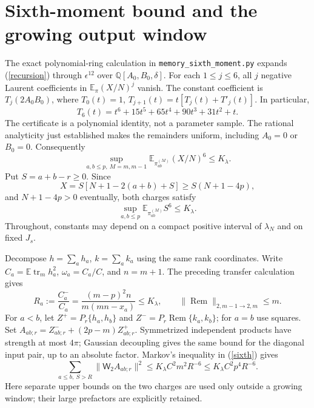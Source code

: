 \documentclass[11pt,a4paper]{article}
\newcommand{\EE}{\mathbb E}
\newcommand{\tr}{\operatorname{tr}}
\newcommand{\Rem}{\operatorname{Rem}}
\newcommand{\W}{\mathsf W_2}
\begin{document}
\newpage
\section{Sixth-moment bound and the growing output window}
The exact polynomial-ring calculation in
\texttt{memory\_sixth\_moment.py} expands (\ref{recursion}) through
$\epsilon^{12}$ over $\mathbb Q[A_0,B_0,\delta]$. For each $1\leq j\leq6$,
all $j$ negative Laurent coefficients in $\EE_\pi(X/N)^j$ vanish.
The constant coefficient is $T_j(2A_0B_0)$, where
$T_0(t)=1$, $T_{j+1}(t)=t[T_j(t)+T'_j(t)]$. In particular,
\begin{equation}
 T_6(t)=t^6+15t^5+65t^4+90t^3+31t^2+t.\label{touchard}
\end{equation}
The certificate is a polynomial identity, not a parameter sample.
The rational analyticity just established makes the remainders
uniform, including $A_0=0$ or $B_0=0$. Consequently
\begin{equation}
 \sup_{a,b\leq p,\ M=m,m-1}\EE_{\pi^{(M)}_{ab}}(X/N)^6\leq K_\lambda.
\end{equation}
Put $S=a+b-r\geq0$. Since
\begin{equation}
 X=S[N+1-2(a+b)+S]\geq S(N+1-4p),
\end{equation}
and $N+1-4p>0$ eventually, both charges satisfy
\begin{equation}
 \sup_{a,b\leq p}\EE_{\pi^{(M)}_{ab}}S^6\leq K_\lambda.\label{sixth}
\end{equation}
Throughout, constants may depend on a compact positive interval of
$\lambda_N$ and on fixed $J_s$.

Decompose $h=\sum_a h_a$, $k=\sum_a k_a$ using the same rank
coordinates. Write $C_a=\EE\tr_m h_a^2$, $\omega_a=C_a/C$,
and $n=m+1$. The preceding transfer calculation gives
\begin{equation}
 R_a:=\frac{C_a^-}{C_a}
 =\frac{(m-p)^2n}{m(mn-x_a)}\leq K_\lambda,\qquad
 \|\Rem\|_{2,m-1\to2,m}\leq m.
\end{equation}
For $a<b$, let $Z^+=P_r\{h_a,h_b\}$ and
$Z^-=P_r\Rem\{k_a,k_b\}$; for $a=b$ use squares. Set
$A_{ab;r}=Z^-_{ab;r}+(2p-m)Z^+_{ab;r}$.
Symmetrized independent products have strength at most $4\pi$;
Gaussian decoupling gives the same bound for the diagonal input pair,
up to an absolute factor. Markov's inequality in (\ref{sixth}) gives
\begin{equation}
 \sum_{a\leq b,\ S>R}\|\W A_{ab;r}\|^2
 \leq K_\lambda C^2m^2R^{-6}
 \leq K_\lambda C^2p^4R^{-6}.\label{tail}
\end{equation}
Here separate upper bounds on the two charges are used only outside
a growing window; their large prefactors are explicitly retained.
\end{document}
